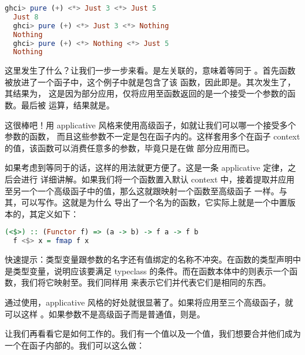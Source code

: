 \documentclass[./main.tex]{subfiles}
\begin{document}
\begin{lstlisting}[language=Haskell]
  ghci> pure (+) <*> Just 3 <*> Just 5
  Just 8
  ghci> pure (+) <*> Just 3 <*> Nothing
  Nothing
  ghci> pure (+) <*> Nothing <*> Just 5
  Nothing
\end{lstlisting}

这里发生了什么？让我们一步一步来看。\acode{<*>}是左关联的，意味着等同于
。首先\acode{+}函数被放进了一个函子中，这个例子中就是包含了该
函数，因此即是。其次发生了，其结果为，
这是因为部分应用，仅将应用至\acode{+}函数返回的是一个接受一个参数的函数。最后被
运算，结果就是。

这很棒吧！用 applicative 风格来使用高级函子，如就让我们可以哪一个接受多个参数的函数，
而且这些参数不一定是包在函子内的。这样套用多个在函子 context 的值，该函数可以消费任意多的参数，毕竟\acode{<*>}只是在做
部分应用而已。

如果考虑到等同于的话，这样的用法就更方便了。这是一条 applicative 定律，之后会进行
详细讲解。如果我们将一个函数置入默认 context 中，接着提取并应用至另一个一个高级函子中的值，那么这就跟映射一个函数至高级函子
一样。与其，可以写作。这就是为什么
导出了一个名为\acode{<\$>}的函数，它实际上就是一个中置版本的，其定义如下：

\begin{lstlisting}[language=Haskell]
  (<$>) :: (Functor f) => (a -> b) -> f a -> f b
  f <$> x = fmap f x
\end{lstlisting}

\begin{anote}
  快速提示：类型变量跟参数的名字还有值绑定的名称不冲突。在函数的类型声明中是类型变量，说明应该要满足
   typeclass 的条件。而在函数本体中的则表示一个函数，我们将它映射至。我们同样用
  来表示它们并代表它们是相同的东西。
\end{anote}

通过使用\acode{<\$>}，applicative 风格的好处就很显著了。如果将应用至三个高级函子，就可以这样
。如果参数不是高级函子而是普通值，则是。

让我们再看看它是如何工作的。我们有一个值以及一个值，我们想要合并他们成为
一个在函子内部的。我们可以这么做：
\end{document}
